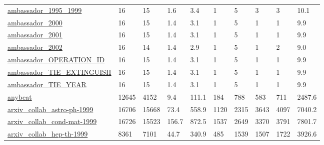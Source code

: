 \begin{longtable}{llllllllll}
 \href{https://sites.google.com/site/ucinetsoftware/datasets/covert-networks/philippinesbombing}{ambassador\_1995\_1999}      & 16         & 15    & 1.6    & 3.4    & 1     & 5      & 3      & 3      & 10.1    \\
 \href{https://sites.google.com/site/ucinetsoftware/datasets/covert-networks/philippinesbombing}{ambassador\_2000}           & 16         & 15    & 1.4    & 3.1    & 1     & 5      & 1      & 1      & 9.9     \\
 \href{https://sites.google.com/site/ucinetsoftware/datasets/covert-networks/philippinesbombing}{ambassador\_2001}           & 16         & 15    & 1.4    & 3.1    & 1     & 5      & 1      & 1      & 9.9     \\
 \href{https://sites.google.com/site/ucinetsoftware/datasets/covert-networks/philippinesbombing}{ambassador\_2002}           & 16         & 14    & 1.4    & 2.9    & 1     & 5      & 1      & 2      & 9.0     \\
 \href{https://sites.google.com/site/ucinetsoftware/datasets/covert-networks/philippinesbombing}{ambassador\_OPERATION\_ID}   & 16         & 15    & 1.4    & 3.1    & 1     & 5      & 1      & 1      & 9.9     \\
 \href{https://sites.google.com/site/ucinetsoftware/datasets/covert-networks/philippinesbombing}{ambassador\_TIE\_EXTINGUISH} & 16         & 15    & 1.4    & 3.1    & 1     & 5      & 1      & 1      & 9.9     \\
 \href{https://sites.google.com/site/ucinetsoftware/datasets/covert-networks/philippinesbombing}{ambassador\_TIE\_YEAR}       & 16         & 15    & 1.4    & 3.1    & 1     & 5      & 1      & 1      & 9.9     \\
 \href{https://homes.cs.washington.edu/~fire/}{anybeat}                                                                     & 12645      & 4152  & 9.4    & 111.1  & 184   & 788    & 583    & 711    & 2487.6  \\
 \href{http://www-personal.umich.edu/~mejn/netdata/}{arxiv\_collab\_astro-ph-1999}                                            & 16706      & 15668 & 73.4   & 558.9  & 1120  & 2315   & 3643   & 4097   & 7040.2  \\
 \href{http://www-personal.umich.edu/~mejn/netdata/}{arxiv\_collab\_cond-mat-1999}                                            & 16726      & 15523 & 156.7  & 872.5  & 1537  & 2649   & 3370   & 3791   & 7801.7  \\
 \href{http://www-personal.umich.edu/~mejn/netdata/}{arxiv\_collab\_hep-th-1999}                                              & 8361       & 7101  & 44.7   & 340.9  & 485   & 1539   & 1507   & 1722   & 3926.6  \\

\end{longtable}
